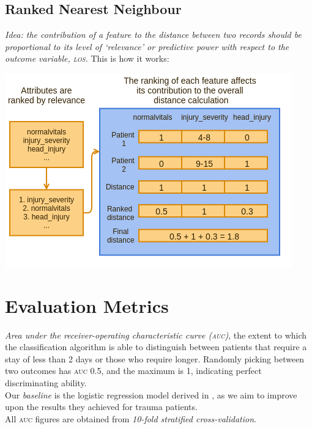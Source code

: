 \documentclass[portrait]{usydposter}
\newcommand{\acronym}[1]{\textsc{#1}\xspace}
\newcommand{\los}{\acronym{los}}
\newcommand{\auc}{\acronym{auc}}
\begin{document}
\begin{multicols}{3}
\subsection{Ranked Nearest Neighbour}
\noindent \textit{Idea: the contribution of a feature to the distance between
two records should be proportional to its level of `relevance' or predictive
power with respect to the outcome variable, \los.} This is how it works:
\begin{center}
\includegraphics{ranked-nn}
\end{center}

\section{Evaluation Metrics}
\noindent \textit{Area under the receiver-operating characteristic curve (\auc)},
the extent to which the classification algorithm is able to distinguish between
patients that require a stay of less than 2 days or those who require longer.
Randomly picking between two outcomes has \auc 0.5, and the maximum is 1,
indicating perfect discriminating ability.
\\

\noindent Our \textit{baseline} is the logistic regression model derived in
\cite{Dinh2013a}, as we aim to improve upon the results they achieved for
trauma patients.
\\

\noindent All \auc figures are obtained from
\textit{10-fold stratified cross-validation}.
\\


\end{multicols}
\end{document}
